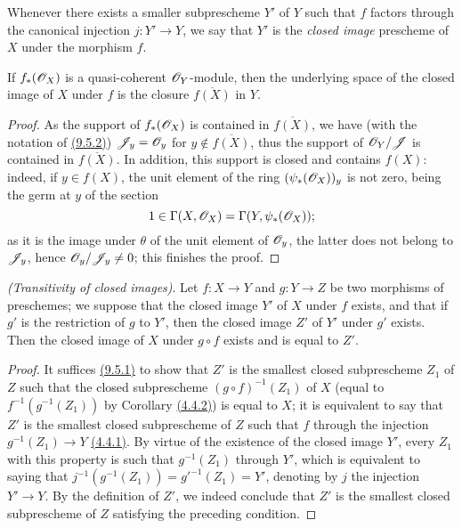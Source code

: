 \begin{defn}[9.5.3]
\label{defn-1.9.5.3}
Whenever there exists a smaller subprescheme $Y'$ of $Y$ such that $f$ factors
through the canonical injection $j:Y'\to Y$, we say that $Y'$ is the
{\it closed image} prescheme of $X$ under the morphism $f$.
\end{defn}

\begin{prop}[9.5.4]
\label{prop-1.9.5.4}
If $f_*(\mathscr{O}_X)$ is a quasi-coherent $\mathscr{O}_Y$-module, then the underlying space of
the closed image of $X$ under $f$ is the closure $\overline{f(X)}$ in $Y$.
\end{prop}

\begin{proof}
\label{proof-prop-1.9.5.4}
As the support of $f_*(\mathscr{O}_X)$ is contained in $\overline{f(X)}$, we have (with
the notation of \hyperref[cor-1.9.5.2]{(9.5.2)}) $\mathscr{J}_y=\mathscr{O}_y$ for
$y\not\in\overline{f(X)}$, thus the support of $\mathscr{O}_Y/\mathscr{J}$ is contained in
$\overline{f(X)}$. In addition, this support is closed and contains $f(X)$:
indeed, if $y\in f(X)$, the unit element of the ring $(\psi_*(\mathscr{O}_X))_y$ is not
zero, being the germ at $y$ of the section
\[
  1\in\Gamma(X,\mathscr{O}_X)=\Gamma(Y,\psi_*(\mathscr{O}_X));
\]
as it is the image under $\theta$ of the unit element of $\mathscr{O}_y$, the latter
does not belong to $\mathscr{J}_y$, hence $\mathscr{O}_y/\mathscr{J}_y\neq 0$; this finishes the
proof.
\end{proof}

\begin{prop}[9.5.5]
\label{prop-1.9.5.5}
{\it (Transitivity of closed images)}. Let $f:X\to Y$ and $g:Y\to Z$ be two morphisms of
preschemes; we suppose that the closed image $Y'$ of $X$ under $f$ exists, and that if $g'$
is the restriction of $g$ to $Y'$, then the closed image $Z'$ of $Y'$ under $g'$ exists. Then
the closed image of $X$ under $g\circ f$ exists and is equal to $Z'$.
\end{prop}

\begin{proof}
\label{proof-prop-1.9.5.5}
It suffices \hyperref[prop-1.9.5.1]{(9.5.1)} to show that $Z'$ is the smallest closed
subprescheme $Z_1$ of $Z$ such that the closed subprescheme $(g\circ f)^{-1}(Z_1)$ of $X$
(equal to $f^{-1}(g^{-1}(Z_1))$ by Corollary \hyperref[cor-1.4.4.2]{(4.4.2)}) is equal to
$X$; it is equivalent to say that $Z'$ is the smallest closed subprescheme of $Z$ such that
$f$  through the injection $g^{-1}(Z_1)\to Y$ \hyperref[prop-1.4.4.1]{(4.4.1)}. By
virtue of the existence of the closed image $Y'$, every $Z_1$ with this property is such
that $g^{-1}(Z_1)$  through $Y'$, which is equivalent to saying that $j^{-1}(g^{-1}(Z_1))=g'^{-1}(Z_1)=Y'$, denoting by $j$ the injection $Y'\to Y$.
By the definition of $Z'$, we indeed conclude that $Z'$ is the smallest closed
subprescheme of $Z$ satisfying the preceding condition.
\end{proof}

